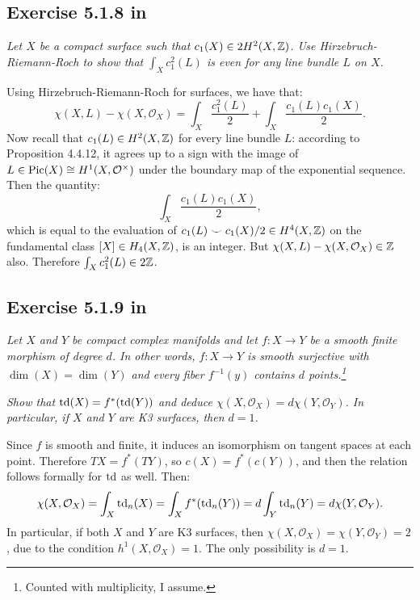 \documentclass{article}
\begin{document}
\subsection*{Exercise 5.1.8 in \cite{Huy}}
\emph{Let $X$ be a compact surface such that $c_1(X) \in 2H^2(X,\mathbb{Z})$. Use Hirzebruch-Riemann-Roch to show that
$\int_X c_1^2(L)$ is even for any line bundle $L$ on $X$.}
\vspace{3mm}

Using Hirzebruch-Riemann-Roch for surfaces, we have that:
\[	\chi(X,L) - \chi(X,\mathcal{O}_X) = \int_X \frac{c_1^2(L)}{2} + \int_X \frac{c_1(L)c_1(X)}{2} .	\]
Now recall that $c_1(L) \in H^2(X,\mathbb{Z})$ for every line bundle $L$: according to Proposition 4.4.12, it agrees up to a sign with
the image of $L \in \operatorname{Pic}(X) \cong H^1(X,\mathcal{O}^{\times})$ under the boundary map of the exponential sequence.
Then the quantity:
\[	\int_X \frac{c_1(L)c_1(X)}{2},	\]
which is equal to the evaluation of $c_1(L) \smile c_1(X) / 2 \in H^4(X,\mathbb{Z})$ on the fundamental class $[X]\in H_4(X,\mathbb{Z})$,
is an integer. But $\chi(X,L) - \chi(X,\mathcal{O}_X) \in \mathbb{Z}$ also. Therefore $\int_X c_1^2(L) \in 2\mathbb{Z}$.



\subsection*{Exercise 5.1.9 in \cite{Huy}}
\emph{Let $X$ and $Y$ be compact complex manifolds and let $f:X \to Y$ be a smooth finite morphism of degree $d$.
In other words, $f:X \to Y$ is smooth surjective with $\dim(X) = \dim(Y)$ and every fiber $f^{-1}(y)$ contains
$d$ points.\footnote{Counted with multiplicity, I assume.}}

\emph{Show that $\operatorname{td}(X) = f^*(\operatorname{td}(Y))$ and deduce $\chi(X,\mathcal{O}_X) = d \chi(Y,\mathcal{O}_Y)$. In particular, if
$X$ and $Y$ are K3 surfaces, then $d=1$.}
\vspace{3mm}

Since $f$ is smooth and finite, it induces an isomorphism on tangent spaces at each point. Therefore $TX = f^*(TY)$,
so $c(X) = f^*(c(Y))$, and then the relation follows formally for $\operatorname{td}$ as well.  Then:
\[	\chi(X,\mathcal{O}_X) = \int_X \operatorname{td}_n(X) = \int_X f^*(\operatorname{td}_n(Y)) = d \int_Y \operatorname{td}_n(Y) = d \chi(Y,\mathcal{O}_Y).	\]
In particular, if both $X$ and $Y$ are K3 surfaces, then $\chi(X,\mathcal{O}_X) = \chi(Y,\mathcal{O}_Y) = 2$, due to
the condition $h^1(X,\mathcal{O}_X) = 1$. The only possibility is $d=1$.
\end{document}
